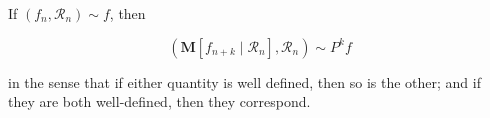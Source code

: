 If $(f_n, \mathcal{R}_n) \sim f$, then

$$(\mathbf{M}[f_{n+k} \mid \mathcal{R}_n], \mathcal{R}_n) \sim P^k f$$

in the sense that if either quantity is well defined, then so is the other; and if they are both well-defined, then they correspond.

